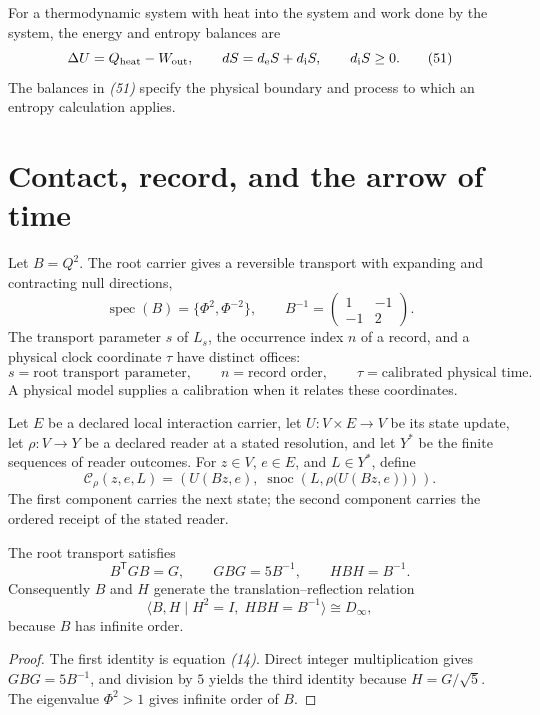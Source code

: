 For a thermodynamic system with heat into the system and work done by the
system, the energy and entropy balances are
\[
\Delta U=Q_{\rm heat}-W_{\rm out},
\qquad
dS=d_{\rm e}S+d_{\rm i}S,\qquad
d_{\rm i}S\geq0.
\tag{51}
\]
The balances in \emph{(51)} specify the physical boundary and process to
which an entropy calculation applies.

\section{Contact, record, and the arrow of time}
\label{sec:contact}

Let $B=Q^2$.  The root carrier gives a reversible transport with expanding
and contracting null directions,
\[
\operatorname{spec}(B)=\{\Phi^2,\Phi^{-2}\},\qquad
B^{-1}=\begin{pmatrix}1&-1\\-1&2\end{pmatrix}.
\tag{52}
\]
The transport parameter $s$ of $L_s$, the occurrence index $n$ of a record,
and a physical clock coordinate $\tau$ have distinct offices:
\[
s=\text{root transport parameter},\qquad
n=\text{record order},\qquad
\tau=\text{calibrated physical time}.
\tag{53}
\]
A physical model supplies a calibration when it relates these coordinates.

\begin{definition}
Let $E$ be a declared local interaction carrier, let $U:V\times E\to V$
be its state update, let $\rho:V\to Y$ be a declared reader at a stated
resolution, and let $Y^\ast$ be the finite sequences of reader outcomes.
For $z\in V$, $e\in E$, and $L\in Y^\ast$, define
\[
\mathcal C_\rho(z,e,L)
=\left(
U(Bz,e),\;
\operatorname{snoc}\!\left(L,\rho\bigl(U(Bz,e)\bigr)\right)
\right).
\tag{54}
\]
The first component carries the next state; the second component carries the
ordered receipt of the stated reader.
\end{definition}

\begin{proposition}
The root transport satisfies
\[
B^{\mathsf T}GB=G,\qquad
GBG=5B^{-1},\qquad
HBH=B^{-1}.
\tag{55}
\]
Consequently $B$ and $H$ generate the translation--reflection relation
\[
\langle B,H\mid H^2=I,\;HBH=B^{-1}\rangle\cong D_\infty,
\tag{56}
\]
because $B$ has infinite order.
\end{proposition}

\begin{proof}
The first identity is equation \emph{(14)}.  Direct integer multiplication
gives $GBG=5B^{-1}$, and division by $5$ yields the third identity because
$H=G/\sqrt5$.  The eigenvalue $\Phi^2>1$ gives infinite order of $B$.
\end{proof}

